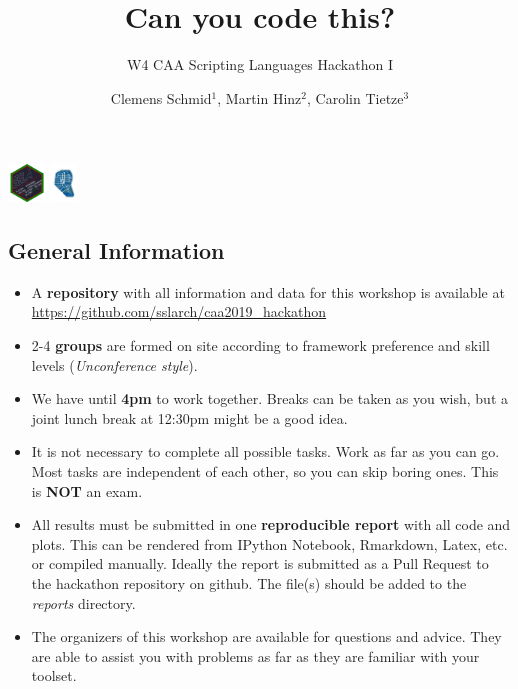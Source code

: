 \documentclass[8pt]{beamer}
\subtitle{W4 CAA Scripting Languages Hackathon I}
\title{Can you code this?}
\author{Clemens Schmid$^{1}$, Martin Hinz$^{2}$, Carolin Tietze$^{3}$}
\institute
{$^{1}$ Römisch-Germanisches Zentralmuseum Leibniz-Forschungsinstitut für Archäologie: Mainz, Rheinland-Pfalz, clemens@nevrome.de; $^{2}$ Institut für Archäologisches Wissenschaften, Universität Bern, martin.hinz@iaw.unibe.ch; $^{3}$ Institut für Klassische Altertumskunde, Christian-Albrechts-Universität zu Kiel, ctietze1991@gmail.com
}
\begin{document}

\begin{frame}
\titlepage
\begin{flushright}
\includegraphics[height=1cm]{images/49449374.png}
\includegraphics[height=1cm]{images/front_20180624.png}
\end{flushright}
\end{frame}



\begin{frame}
\section{General Information}

\begin{itemize}
\item A \textbf{repository} with all information and data for this workshop is available at \newline \url{https://github.com/sslarch/caa2019_hackathon}
\item 2-4 \textbf {groups} are formed on site according to framework preference and skill levels (\textit{Unconference style}).
\item We have until \textbf{4pm} to work together. Breaks can be taken as you wish, but a joint lunch break at 12:30pm might be a good idea. 
\item It is not necessary to complete all possible tasks. Work as far as you can go. Most tasks are independent of each other, so you can skip boring ones. This is \textbf{NOT} an exam.
\item All results must be submitted in one \textbf{reproducible report} with all code and plots. This can be rendered from IPython Notebook, Rmarkdown, Latex, etc. or compiled manually. Ideally the report is submitted as a Pull Request to the hackathon repository on github. The file(s) should be added to the \emph{reports} directory.
\item The organizers of this workshop are available for questions and advice. They are able to assist you with problems as far as they are familiar with your toolset.

\end{itemize}

\end{frame}
\end{document}
